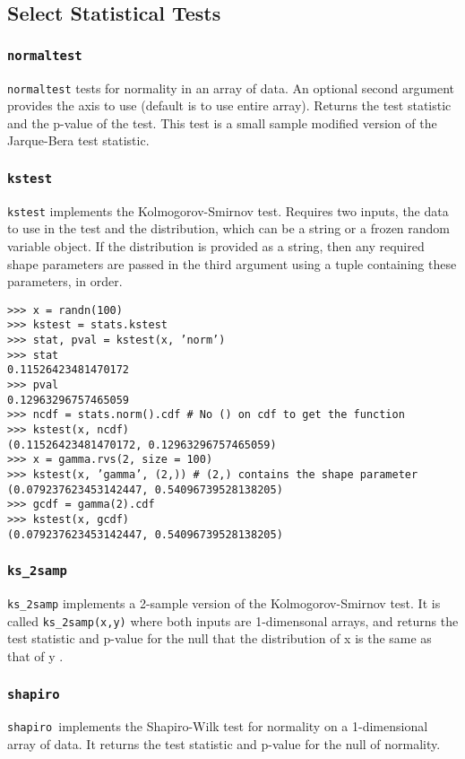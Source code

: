 \documentclass[KSmain.tex]{subfiles}
\begin{document}
\subsection{Select Statistical Tests}

\subsubsection*{\texttt{normaltest}}
\texttt{normaltest} tests for normality in an array of data. An optional second argument provides the axis to use
(default is to use entire array). Returns the test statistic and the p-value of the test. This test is a small
sample modified version of the Jarque-Bera test statistic.
\subsubsection*{\texttt{kstest}}
\texttt{kstest} implements the Kolmogorov-Smirnov test. Requires two inputs, the data to use in the test and the
distribution, which can be a string or a frozen random variable object. If the distribution is provided as
a string, then any required shape parameters are passed in the third argument using a tuple containing
these parameters, in order.
\begin{verbatim}
>>> x = randn(100)
>>> kstest = stats.kstest
>>> stat, pval = kstest(x, ’norm’)
>>> stat
0.11526423481470172
>>> pval
0.12963296757465059
>>> ncdf = stats.norm().cdf # No () on cdf to get the function
>>> kstest(x, ncdf)
(0.11526423481470172, 0.12963296757465059)
>>> x = gamma.rvs(2, size = 100)
>>> kstest(x, ’gamma’, (2,)) # (2,) contains the shape parameter
(0.079237623453142447, 0.54096739528138205)
>>> gcdf = gamma(2).cdf
>>> kstest(x, gcdf)
(0.079237623453142447, 0.54096739528138205)
\end{verbatim}

\subsubsection{\texttt{ks\_2samp}}
\texttt{ks\_2samp} implements a 2-sample version of the Kolmogorov-Smirnov test. It is called \texttt{ks\_2samp(x,y)}
where both inputs are 1-dimensonal arrays, and returns the test statistic and p-value for the null that
the distribution of x is the same as that of y .
\subsubsection{\texttt{shapiro}}
\texttt{shapiro }implements the Shapiro-Wilk test for normality on a 1-dimensional array of data. It returns the
test statistic and p-value for the null of normality.
\end{document}
